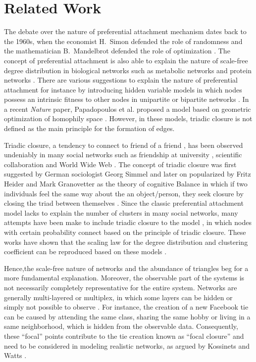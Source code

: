 \documentclass{jimis}
\begin{document}
\section{Related Work}
The debate over the nature of preferential attachment mechanism dates
back to the 1960s, when the economist H.~Simon defended the role of
randomness and the mathematician B.~Mandelbrot defended the role of
optimization \citep{barabasi2012network}. The concept of preferential
attachment is also able to explain the nature of scale-free degree
distribution in biological networks such as metabolic networks
\citep{jeong2000large} and protein networks
\citep{jeong2001lethality}. There are various suggestions to explain the
nature of preferential attachment for instance by introducing  hidden variable
models in which nodes possess an intrinsic fitness to other nodes in
unipartite \citep{boguna2003class} or bipartite networks
\citep{kitsak2011}. In a recent \emph{Nature} paper, Papadopoulos et
al. proposed a model based on geometric optimization of homophily space
\citep{papadopoulos2012popularity}. However, in these models, 
triadic closure is not defined as the main principle for the formation
of edges.  

Triadic closure, a tendency to connect to friend of a friend
\citep{rapoport1953spread}, has been observed undeniably in many social
networks such as friendship at university
\citep{kossinets2006empirical}, scientific collaboration
\citep{newman2001clustering} and World Wide Web
\citep{adamic1999small}. The concept of triadic closure was first
suggested by German sociologist Georg Simmel
\citeyear{simmel1950sociology} and later on popularized by Fritz Heider
and Mark Granovetter as the theory of cognitive Balance in which if two
individuals feel the same way about the an object/person, they seek
closure by closing the triad between themselves
\citep{heider2013psychology}.  
Since the classic preferential attachment model lacks to explain the number of clusters in many social networks, many attempts have been make to include triadic closure to the model \citep{holme2002growing,vazquez2003growing}, in
which nodes with certain probability connect based on the principle of
triadic closure.  These works have shown that the scaling law for the
degree distribution and clustering coefficient can be reproduced based
on these models \citep{klimek2013triadic}.

Hence,the scale-free nature of networks and the abundance of triangles beg for
a more fundamental explanation.  Moreover, the observable part of the
systems is not necessarily completely representative for the entire
system.  Networks are generally multi-layered or multiplex, in which some
layers can be hidden or simply not possible to observe
\citep{kivela2014multilayer}.  For instance, the creation of a new Facebook tie
can be caused by attending the same class, sharing the same hobby or
living in a same neighborhood,  which is hidden from the observable
data.  Consequently, these ``focal'' points contribute to the tie
creation known as ``focal closure'' and need to be considered in
modeling realistic networks, as argued by Kossinets and Watts
\citeyearpar{kossinets2006empirical}.  
  
\end{document}

